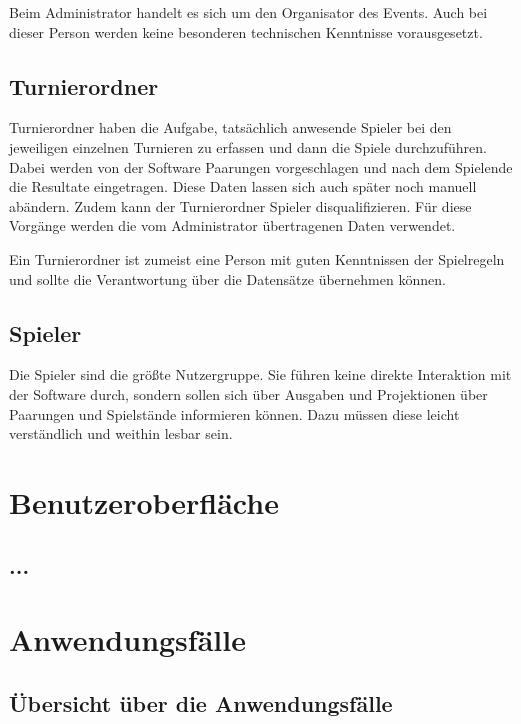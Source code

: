 \documentclass[11pt]{article}
\begin{document}
Beim Administrator handelt es sich um den Organisator des Events. Auch bei dieser Person werden keine besonderen technischen Kenntnisse vorausgesetzt.

\subsection{Turnierordner}

Turnierordner haben die Aufgabe, tatsächlich anwesende Spieler bei den jeweiligen einzelnen Turnieren zu erfassen und dann die Spiele durchzuführen. Dabei werden von der Software Paarungen vorgeschlagen und nach dem Spielende die Resultate eingetragen. Diese Daten lassen sich auch später noch manuell abändern. Zudem kann der Turnierordner Spieler disqualifizieren. Für diese Vorgänge werden die vom Administrator übertragenen Daten verwendet.

Ein Turnierordner ist zumeist eine Person mit guten Kenntnissen der Spielregeln und sollte die Verantwortung über die Datensätze übernehmen können.

\subsection{Spieler}

Die Spieler sind die größte Nutzergruppe. Sie führen keine direkte Interaktion mit der Software durch, sondern sollen sich über Ausgaben und Projektionen über Paarungen und Spielstände informieren können. Dazu müssen diese leicht verständlich und weithin lesbar sein.

\section{Benutzeroberfläche}

\subsection{...}

\section{Anwendungsfälle}

\subsection{Übersicht über die Anwendungsfälle}
\end{document}
